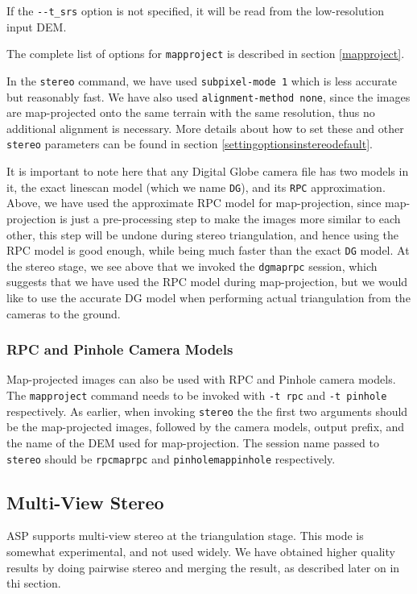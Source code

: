 If the \texttt{-\/-t\_srs} option is not specified, it will be read from
the low-resolution input DEM.

The complete list of options for \texttt{mapproject} is described in
section \ref{mapproject}.

In the \texttt{stereo} command, we have used \texttt{subpixel-mode 1}
which is less accurate but reasonably fast. We have also used
\texttt{alignment-method none}, since the images are map-projected onto
the same terrain with the same resolution, thus no additional alignment
is necessary. More details about how to set these and other
\texttt{stereo} parameters can be found in section
\ref{settingoptionsinstereodefault}.

It is important to note here that any Digital Globe camera file has two
models in it, the exact linescan model (which we name \texttt{DG}), and
its \texttt{RPC} approximation. Above, we have used the approximate RPC
model for map-projection, since map-projection is just a pre-processing
step to make the images more similar to each other, this step will be
undone during stereo triangulation, and hence using the RPC model is
good enough, while being much faster than the exact \texttt{DG}
model. At the stereo stage, we see above that we invoked the
\texttt{dgmaprpc} session, which suggests that we have used the RPC
model during map-projection, but we would like to use the accurate DG
model when performing actual triangulation from the cameras to the
ground.

\subsubsection{RPC and Pinhole Camera Models}

Map-projected images can also be used with RPC and Pinhole camera
models. The \texttt{mapproject} command needs to be invoked with
\texttt{-t rpc} and \texttt{-t pinhole} respectively. As earlier, when
invoking \texttt{stereo} the the first two arguments should be the
map-projected images, followed by the camera models, output prefix, and
the name of the DEM used for map-projection. The session name passed to
\texttt{stereo} should be \texttt{rpcmaprpc} and
\texttt{pinholemappinhole} respectively.

\subsection{Multi-View Stereo}
\label{multiview}

ASP supports multi-view stereo at the triangulation stage. This mode is
somewhat experimental, and not used widely. We have obtained higher
quality results by doing pairwise stereo and merging the result, as
described later on in thi section.

